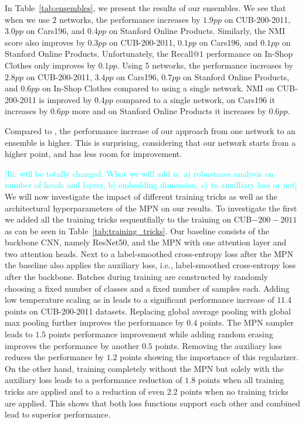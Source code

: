 \documentclass{article}
\newcommand{\ili}[1]{{\textcolor{cyan}{[Ili: #1]}}}
\begin{document}
\iffalse
CUB-200-2011 & 72.2 & 74.3 & 73.1 & 74.4 \\
Cars196 & 90.9 & 74.9 & 91.5 & 75.4 \\
Stanford Online Products & 81.8 & 92.7 & 82.1 & 92.8 \\
In-Shop Clothes & 92.9 & - & 93.4 &  \\
\fi 
In Table~\ref{tab:ensembles}, we present the results of our ensembles. We see that when we use $2$ networks, the performance increases by $1.9pp$ on CUB-200-2011, $3.0pp$ on Cars196, and $0.4pp$ on Stanford Online Products.  Similarly, the NMI score also improves by $0.3pp$ on CUB-200-2011, $0.1pp$ on Cars196, and $0.1pp$ on Stanford Online Products. Unfortunately, the Recall@$1$ performance on In-Shop Clothes only improves by $0.1pp$.
Using $5$ networks, the performance increases by $2.8pp$ on CUB-200-2011, $3.4pp$ on Cars196, $0.7pp$ on Stanford Online Products, and $0.6pp$ on In-Shop Clothes compared to using a single network. NMI on CUB-200-2011 is improved by $0.4pp$ compared to a single network, on Cars196 it increases by $0.6pp$ more and on Stanford Online Products it increases by $0.6pp$.

Compared to \cite{DBLP:conf/eccv/GrLoss}, the performance increase of our approach from one network to an ensemble is higher. This is surprising, considering that our network starts from a higher point, and has less room for improvement.
\noindent

\iffalse
\ili{will be totally changed. What we will add is: a) robustness analysis on number of heads and layers, b) embedding dimension, c) to auxilliary loss or not}
We will now investigate the impact of different training tricks as well as the architectural hyperparameters of the MPN on our results. To investigate the first we added all the training tricks sequentfially to the training on CUB$-200-2011$ as can be seen in Table~\ref{tab:training_tricks}. Our baseline consists of the backbone CNN, namely ResNet50, and the MPN with one attention layer and two attention heads. Next to a label-smoothed cross-entropy loss after the MPN the baseline also applies the auxiliary loss, i.e., label-smoothed cross-entropy loss after the backbone. Batches during training are constructed by randomly choosing a fixed number of classes and a fixed number of samples each. Adding low temperature scaling as in \cite{DBLP:journals/corr/abs-1811-12649;DBLP:journals/corr/abs-2004-01113} leads to a significant performance increase of $11.4$ points on CUB-200-2011 datasets. Replacing global average pooling with global max pooling further improves the performance by $0.4$ points.
The MPN sampler leads to $1.5$ points performance improvement while adding random erasing \cite{DBLP:conf/aaai/Zhong0KL020} improves the performance by another $0.5$ points. Removing the auxiliary loss reduces the performance by $1.2$ points showing the importance of this regularizer. On the other hand, training completely without the MPN but solely with the auxiliary loss leads to a performance reduction of $1.8$ points when all training tricks are applied and to a reduction of even $2.2$ points when no training tricks are applied. This shows that both loss functions support each other and combined lead to superior performance.
\end{document}

